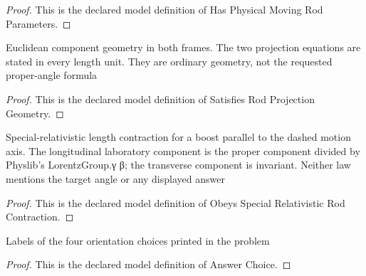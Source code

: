 \begin{proof}
  This is the declared model definition of Has Physical Moving Rod Parameters.
\end{proof}
\begin{definition}
  \label{def:physics:phyx-mini-0526:phyxminiproblems-problemphyxmini0526-satisfiesrodprojectiongeometry}
  Euclidean component geometry in both frames. The two projection equations are stated in every length unit. They are ordinary geometry, not the requested proper-angle formula
\end{definition}
\begin{proof}
  This is the declared model definition of Satisfies Rod Projection Geometry.
\end{proof}
\begin{definition}
  \label{def:physics:phyx-mini-0526:phyxminiproblems-problemphyxmini0526-obeysspecialrelativisticrodcontraction}
  Special-relativistic length contraction for a boost parallel to the dashed motion axis. The longitudinal laboratory component is the proper component divided by Physlib's LorentzGroup.γ β; the transverse component is invariant. Neither law mentions the target angle or any displayed answer
\end{definition}
\begin{proof}
  This is the declared model definition of Obeys Special Relativistic Rod Contraction.
\end{proof}
\begin{definition}
  \label{def:physics:phyx-mini-0526:phyxminiproblems-problemphyxmini0526-answerchoice}
  Labels of the four orientation choices printed in the problem
\end{definition}
\begin{proof}
  This is the declared model definition of Answer Choice.
\end{proof}
